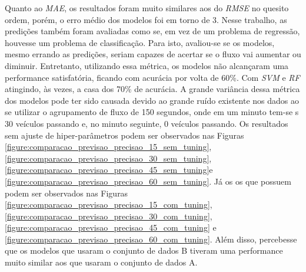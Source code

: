 Quanto ao \textit{\acrshort{MAE}}, os resultados foram muito similares aos do \textit{\acrshort{RMSE}} no quesito ordem, porém, o erro médio dos modelos foi em torno de 3. Nesse trabalho, as predições também foram avaliadas como se, em vez de um problema de regressão, houvesse um problema de classificação. Para isto, avaliou-se se os modelos, mesmo errando as predições, seriam capazes de acertar se o fluxo vai aumentar ou diminuir. Entretanto, utilizando essa métrica, os modelos não alcançaram uma performance satisfatória, ficando com acurácia por volta de 60\%. Com \textit{\acrshort{SVM}} e \textit{\acrshort{RF}} atingindo, às vezes, a casa dos 70\% de acurácia. A grande variância dessa métrica dos modelos pode ter sido causada devido ao grande ruído existente nos dados ao se utilizar o agrupamento de fluxo de 150 segundos, onde em um minuto tem-se s 30 veículos passando e, no minuto seguinte, 0 veículos passando. Os resultados sem ajuste de hiper-parâmetros podem ser observados nas Figuras \ref{figure:comparacao_previsao_precisao_15_sem_tuning}, \ref{figure:comparacao_previsao_precisao_30_sem_tuning}, \ref{figure:comparacao_previsao_precisao_45_sem_tuning}e
\ref{figure:comparacao_previsao_precisao_60_sem_tuning}. Já os os que possuem podem ser observados nas Figuras 
\ref{figure:comparacao_previsao_precisao_15_com_tuning},
\ref{figure:comparacao_previsao_precisao_30_com_tuning},
\ref{figure:comparacao_previsao_precisao_45_com_tuning} e
\ref{figure:comparacao_previsao_precisao_60_com_tuning}. Além disso, percebesse que os modelos que usaram o conjunto de dados B tiveram uma performance muito similar aos que usaram o conjunto de dados A. 